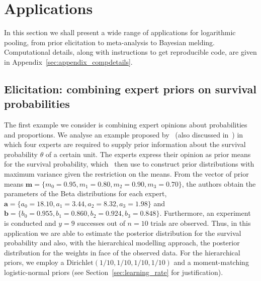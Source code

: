 \documentclass[a4paper, notitlepage, 11pt]{article}
\begin{document}
\section{Applications}
\label{sec:apps}

In this section we shall present a wide range of applications for logarithmic pooling, from prior elicitation to meta-analysis to Bayesian melding.
Computational details, along with instructions to get reproducible code, are given in  Appendix~\ref{sec:appendix_compdetails}.

\subsection{Elicitation: combining expert priors on survival probabilities}
\label{sec:survivalProbs}

The first example we consider is combining expert opinions about probabilities and proportions.
We analyse an example proposed by~\cite{Savchuk1994} (also discussed in~\cite{Rufo2012B}) in which four experts are required to supply prior information about the survival probability $\theta$ of a certain unit.
The experts express their opinion as prior means for the survival probability, which~\cite{Savchuk1994} then use to construct prior distributions with maximum variance given the restriction on the means.
From the vector of prior means $\mathbf{m} = \{ m_0 = 0.95, m_1 = 0.80, m_2 = 0.90, m_3 = 0.70 \}$, the authors obtain the parameters of the Beta distributions for each expert,  $\mathbf{a} = \{ a_0 = 18.10, a_1 = 3.44 , a_2 = 8.32, a_3 = 1.98 \}$ and  $\mathbf{b} = \{ b_0 = 0.955 , b_1 = 0.860, b_2 = 0.924, b_3 = 0.848\}$.
Furthermore, an experiment is conducted and $y = 9$ successes out of $n = 10$ trials are observed.
Thus, in this application we are able to estimate the posterior distribution for the survival probability and also, with  the hierarchical modelling approach, the posterior distribution for the weights in face of the observed data.
For the hierarchical priors, we employ a $\text{Dirichlet}(1/10, 1/10, 1/10, 1/10)$ and a moment-matching logistic-normal priors (see Section~\ref{sec:learning_rate} for justification).
\end{document}
